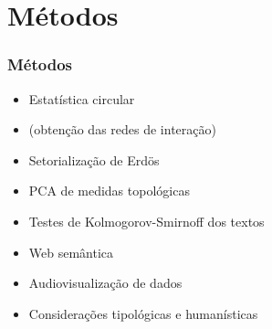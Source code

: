 \documentclass[10pt]{beamer}
\begin{document}
\section{Métodos}
\begin{frame}
\frametitle{Métodos}
\begin{itemize}
	\item Estatística circular
	\item (obtenção das redes de interação)
	\item Setorialização de Erdös
	\item PCA de medidas topológicas
	\item Testes de Kolmogorov-Smirnoff dos textos
	\item Web semântica
	\item Audiovisualização de dados
	\item Considerações tipológicas e humanísticas
\end{itemize}
\end{frame}
\end{document}
